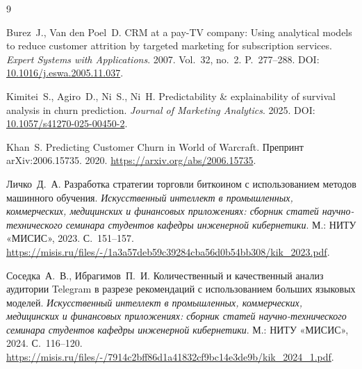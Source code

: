 \documentclass{misisarticle}
\begin{document}
\begin{thebibliography}{9}

Burez~J., Van den Poel~D.
CRM at a pay-TV company: Using analytical models to reduce customer attrition by targeted marketing for subscription services.
\textit{Expert Systems with Applications}. 2007. Vol.~32, no.~2. P.~277--288.
DOI: \href{https://doi.org/10.1016/j.eswa.2005.11.037}{10.1016/j.eswa.2005.11.037}.

Kimitei~S., Agiro~D., Ni~S., Ni~H.
Predictability \& explainability of survival analysis in churn prediction.
\textit{Journal of Marketing Analytics}. 2025.
DOI: \href{https://doi.org/10.1057/s41270-025-00450-2}{10.1057/s41270-025-00450-2}.

Khan~S. Predicting Customer Churn in World of Warcraft.
Препринт arXiv:2006.15735. 2020.
\url{https://arxiv.org/abs/2006.15735}.

Личко~Д.~А. Разработка стратегии торговли биткоином с использованием методов машинного обучения.
\textit{Искусственный интеллект в промышленных, коммерческих, медицинских и финансовых приложениях: сборник статей научно-технического семинара студентов кафедры инженерной кибернетики}. М.: НИТУ «МИСИС», 2023. С.~151--157.
\url{https://misis.ru/files/-/1a3a57deb59c39284cba56d0b54bb308/kik_2023.pdf}.

Соседка~А.~В., Ибрагимов~П.~И. Количественный и качественный анализ аудитории Telegram в разрезе рекомендаций с использованием больших языковых моделей.
\textit{Искусственный интеллект в промышленных, коммерческих, медицинских и финансовых приложениях: сборник статей научно-технического семинара студентов кафедры инженерной кибернетики}. М.: НИТУ «МИСИС», 2024. С.~116--120.
\url{https://misis.ru/files/-/7914c2bff86d1a41832cf9bc14e3de9b/kik_2024_1.pdf}.

\end{thebibliography}
\end{document}
